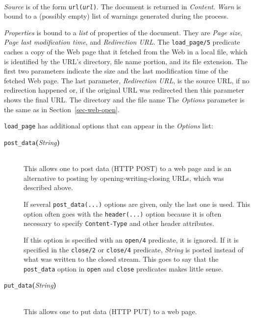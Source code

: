 \begin{description}
  \\
  {\it Source} is of the form {\tt url({\it {url}})}.
  The document is returned in {\it Content}.
  {\it Warn} is bound to a (possibly empty) list of warnings generated during the process.

  {\it Properties} is bound to a \emph{list} of properties of the document. They
  are {\it Page size}, {\it Page last modification time}, and \emph{Redirection
  URL}.  
  The {\tt load\_page/5}  predicate caches a copy of the Web page that it
  fetched from the Web in a local file, which is identified by the URL's
  directory, file name portion, and  its file
    extension. The first two parameters indicate the size and the last
  modification time of the fetched Web page.
  The last parameter, \emph{Redirection URL}, is the source URL, if no
  redirection happened or, if the original URL was redirected then this
  parameter shows the final URL.
  The directory and the file name 
  The \emph{Options} parameter is the same as in
  Section~\ref{sec-web-open}.

  \texttt{load\_page} has additional options that can appear in the
  \emph{Options} list:
  \begin{description}
  \item[{\tt post\_data}{\bf (}{\it String}{\bf )}]\mbox{}\\
    This allows one to post data (HTTP POST)
    to a web page and is an alternative to
    posting by opening-writing-closing URLs, which was described above.

    If several \texttt{post\_data(...)} options are given, only the last one is
    used. This option often goes with the \texttt{header(...)} option because it
    is often necessary to specify \texttt{Content-Type} and other header
    attributes.  

    If this option is specified with an \texttt{open/4} predicate, it is
    ignored.  If it is specified in the \texttt{close/2} or 
    \texttt{close/4}   predicate, \emph{String} is posted instead of what was
    written to the closed stream. This goes to say that the \texttt{post\_data}
    option in \texttt{open} and \texttt{close} predicates makes little sense. 
    \item[{\tt put\_data}{\bf (}{\it String}{\bf )}]\mbox{}\\
    This allows one to put data (HTTP PUT) to a web page.


\end{description}
\end{description}
